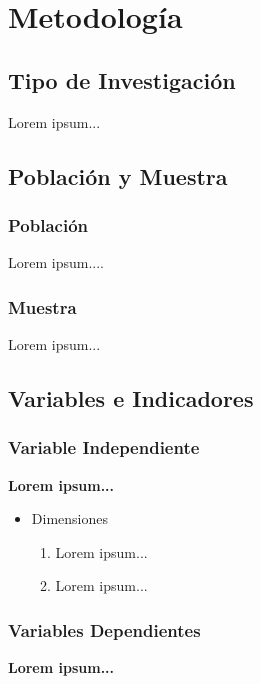 \section{Metodología}

\subsection{Tipo de Investigación}

Lorem ipsum...

\subsection{Población y Muestra}

\subsubsection{Población}

Lorem ipsum....

\subsubsection{Muestra}

Lorem ipsum...

\subsection{Variables e Indicadores}

\subsubsection{Variable Independiente}

\textbf{Lorem ipsum...}

\begin{itemize}
	\item Dimensiones
	\begin{enumerate}
		\item Lorem ipsum...
		\item Lorem ipsum...
	\end{enumerate}
\end{itemize}

\subsubsection{Variables Dependientes}

\textbf{Lorem ipsum...}

